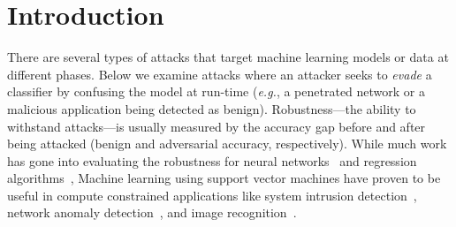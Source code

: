 \documentclass[fonts]{icst}
\begin{document}

\maketitle




%



\section{Introduction}
There are several types of attacks that target machine learning models or data at different phases.
Below we examine attacks where an attacker seeks to \emph{evade} a classifier by confusing the model at run-time (\textit{e.g.}, a penetrated network or a malicious application being detected as benign).
Robustness---the ability to withstand attacks---is usually measured by the accuracy gap before and after being attacked (benign and adversarial accuracy, respectively).
While much work has gone into evaluating the robustness for neural networks~\cite{szegedy2013intriguing,madry2017towards,croce2020reliable} and regression algorithms~\cite{deka2019adversarial},
Machine learning using support vector machines have proven to be useful in compute constrained applications like system intrusion detection~\cite{kim2003network}, network anomaly detection~\cite{mehmood2015svm}, and image recognition~\cite{tzotsos2008support}.
\end{document}
